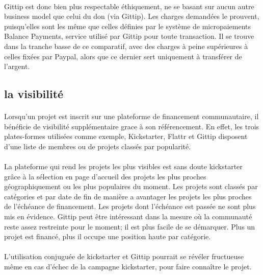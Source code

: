 \paragraph{}
Gittip est donc bien plus respectable éthiquement, ne se basant sur aucun autre
business model que celui du don (via Gittip). Les charges demandées le
prouvent, puisqu'elles sont les même que celles définies par le système de
micropaiements Balance Payments, service utilisé par Gittip pour toute
transaction. Il se trouve dans la tranche basse de ce comparatif, avec des
charges à peine supérieures à celles fixées par Paypal, alors que ce dernier
sert uniquement à transférer de l'argent.

\subsection{la visibilité}

\paragraph{}
Lorsqu'un projet est inscrit sur une plateforme de financement communautaire,
il bénéficie de visibilité supplémentaire grace à son référencement. En effet,
les trois plates-formes utilisées comme exemple, Kickstarter, Flattr et Gittip
disposent d'une liste de membres ou de projets classés par popularité.

\paragraph{}
La plateforme qui rend les projets les plus visibles est sans doute kickstarter
grâce à la sélection en page d'accueil des projets les plus proches
géographiquement ou les plus populaires du moment. Les projets sont classés par
catégories et par date de fin de manière a avantager les projets les plus
proches de l'échéance de financement. Les projets dont l'échéance est passée ne
sont plus mis en évidence.
Gittip peut être intéressant dans la mesure où la communauté reste assez
restreinte pour le moment; il est plus facile de se démarquer. Plus un projet
est financé, plus il occupe une position haute par catégorie.

\paragraph{}
L'utilisation conjuguée de kickstarter et Gittip pourrait se révéler fructueuse
même en cas d'échec de la campagne kickstarter, pour faire connaître le projet.

